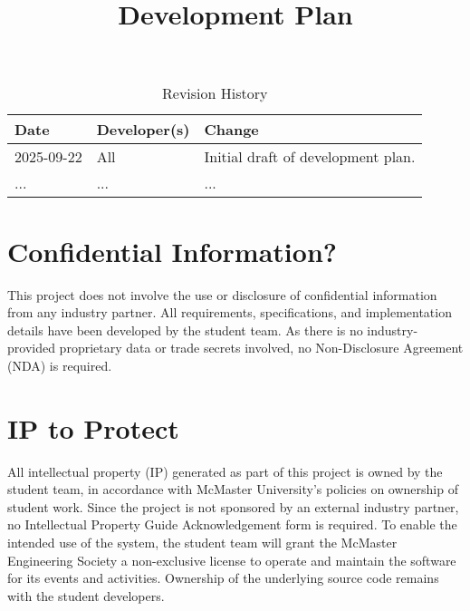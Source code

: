 \documentclass{article}
\title{Development Plan\\\progname}
\author{\authname}
\date{}
\begin{document}
\maketitle

\begin{table}[hp]
\caption{Revision History} \label{TblRevisionHistory}
\begin{tabularx}{\textwidth}{llX}
\toprule
\textbf{Date} & \textbf{Developer(s)} & \textbf{Change}\\
\midrule
2025-09-22 & All & Initial draft of development plan.\\
... & ... & ...\\
\bottomrule
\end{tabularx}
\end{table}

\newpage{}



\section{Confidential Information?}

This project does not involve the use or disclosure of confidential information 
from any industry partner. All requirements, specifications, and implementation 
details have been developed by the student team. As there is no industry-provided proprietary data 
or trade secrets involved, no Non-Disclosure Agreement (NDA) is required. 

\section{IP to Protect}

All intellectual property (IP) generated as part of this project is owned by the 
student team, in accordance with McMaster University’s policies on ownership of 
student work. Since the project is not sponsored by an external industry partner, 
no Intellectual Property Guide Acknowledgement form is required. To enable the 
intended use of the system, the student team will grant the McMaster Engineering 
Society a non-exclusive license to operate and maintain the software for its 
events and activities. Ownership of the underlying source code remains with the 
student developers. 
\end{document}
